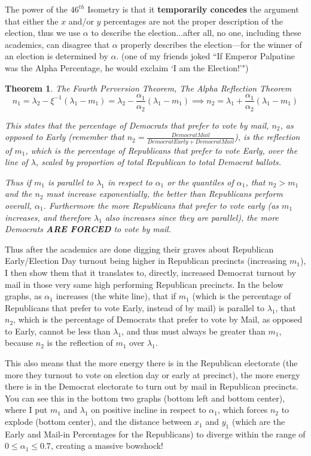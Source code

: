 \documentclass[preprint,13pt]{elsarticle}
\newtheorem{theorem}{Theorem}[section]
\begin{document}
The power of the $46^{th}$ Isometry is that it \textbf{temporarily concedes} the argument that either the $x$ and/or $y$ percentages are not the proper description of the election, thus we use $\alpha$ to describe the election...after all, no one, including these academics, can disagree that $\alpha$ properly describes the election---for the winner of an election is determined by $\alpha$. (one of my friends joked ``If Emperor Palpatine was the Alpha Percentage, he would exclaim `I am the Election!'")

\begin{theorem}{The Fourth Perversion Theorem, The Alpha Reflection Theorem}
$$n_{1}=\lambda_{2}-\xi^{-1}(\lambda_1-m_{1})=\lambda_{2}-\frac{\alpha_{1}}{\alpha_{2}}(\lambda_1-m_{1}) \implies n_{2}=\lambda_{1}+\frac{\alpha_{1}}{\alpha_{2}}(\lambda_1-m_{1})$$

This states that the percentage of Democrats that prefer to vote by mail, $n_2$, as opposed to Early (remember that $n_{2}=\frac{Democrat Mail}{Democrat Early+Democrat Mail}$), is the reflection of $m_{1}$, which is the percentage of Republicans that prefer to vote Early, over the line of $\lambda$, scaled by proportion of total Republican to total Democrat ballots.

Thus if $m_{1}$ is parallel to $\lambda_{1}$ in respect to $\alpha_{1}$ or the quantiles of $\alpha_{1}$,  that $n_{2}>m_{1}$ and the $n_{2}$ must increase exponentially, the better than Republicans perform overall, $\alpha_{1}$. Furthermore the more Republicans that prefer to vote early (as $m_{1}$ increases, and therefore $\lambda_{1}$ also increases since they are parallel), the more Democrats \textbf{ARE FORCED} to vote by mail.
\end{theorem}
Thus after the academics are done digging their graves about Republican Early/Election Day turnout being higher in Republican precincts (increasing $m_{1}$), I then show them that it translates to, directly, increased Democrat turnout by mail in those very same high performing Republican precincts.
\newpage
In the below graphs, as $\alpha_{1}$ increases (the white line), that if $m_{1}$ (which is the percentage of Republicans that prefer to vote Early, instead of by mail) is parallel to $\lambda_{1}$, that $n_{2}$, which is the percentage of Democrats that prefer to vote by Mail, as opposed to Early, cannot be less than $\lambda_{1}$, and thus must always be greater than $m_{1}$, because $n_{2}$ is the reflection of $m_{1}$ over $\lambda_{1}$.

This also means that the more energy there is in the Republican electorate (the more they turnout to vote on election day or early at precinct), the more energy there is in the Democrat electorate to turn out by mail in Republican precincts. You can see this in the bottom two graphs (bottom left and bottom center), where I put $m_{1}$ and $\lambda_{1}$ on positive incline in respect to $\alpha_{1}$, which forces $n_{2}$ to explode (bottom center), and the distance between $x_{1}$ and $y_{1}$ (which are the Early and Mail-in Percentages for the Republicans) to diverge within the range of $0 \le \alpha_{1} \le 0.7$, creating a massive bowshock!
\end{document}
